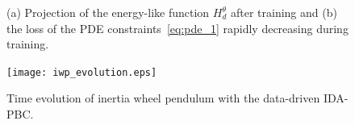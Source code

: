 \begin{figure}[tb]
    \centering
    \hspace{5pt}
    \caption{(a) Projection of the energy-like function $H_d^\theta$ after training and (b)
    the loss of the PDE constraints~\ref{eq:pde_1} rapidly decreasing during training.}
    \label{fig:iwp-projections}
\end{figure}

\begin{figure}[tb]
    \centering
    \texttt{[image: iwp\_evolution.eps]}
    \caption{Time evolution of inertia wheel pendulum with the data-driven IDA-PBC.}
    \label{fig:iwp_evolution}
\end{figure}